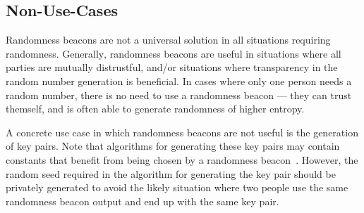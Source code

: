 \subsection{Non-Use-Cases}\label{sub:non_use_cases}
Randomness beacons are not a universal solution in all situations requiring randomness.
Generally‚ randomness beacons are useful in situations where all parties are mutually distrustful, and/or situations where transparency in the random number generation is beneficial.
In cases where only one person needs a random number, there is no need to use a randomness beacon --- they can trust themself, and is often able to generate randomness of higher entropy.

A concrete use case in which randomness beacons are not useful is the generation of key pairs.
Note that algorithms for generating these key pairs may contain constants that benefit from being chosen by a randomness beacon~\cite{baigneres2015trap}.
However, the random seed required in the algorithm for generating the key pair should be privately generated to avoid the likely situation where two people use the same randomness beacon output and end up with the same key pair.

